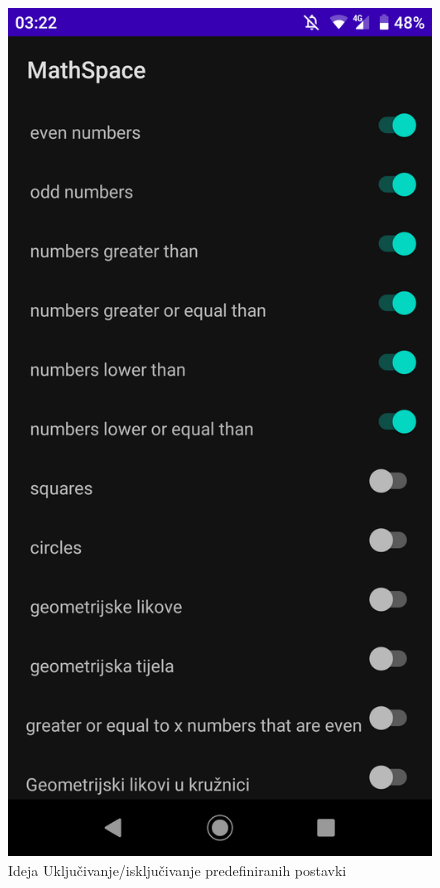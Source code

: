 \documentclass[times, utf8, zavrsni]{fer}
\begin{document}
		\begin{figure}[H]
			\includegraphics[scale = 0.1]{"slike/defaulttasks.png"} 
			\centering
			\caption{Ideja Uključivanje/isključivanje predefiniranih postavki}
			\label{fig:idejaigre}
		\end{figure}
		
\end{document}
